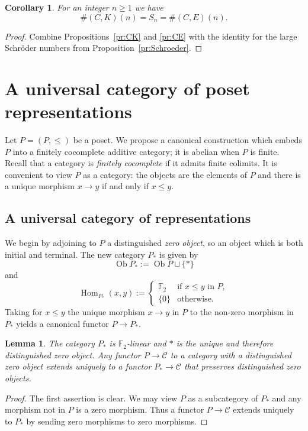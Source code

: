 \documentclass[a4paper]{amsart}
\theoremstyle{plain}
\newtheorem{lem}[thm]{Lemma}
\newtheorem{cor}[thm]{Corollary}
\theoremstyle{definition}
\theoremstyle{remark}
\numberwithin{equation}{section}
\newcommand{\Hom}{\operatorname{Hom}}
\newcommand{\Ob}{\operatorname{Ob}}
\def\C{\mathcal C}
\def\bbF{\mathbb F}
\begin{document}
\begin{cor}\label{pr:CK/CE}
 For an integer $n\ge 1$ we have
 \[\#(C,K)(n)= S_n=\#(C,E)(n).\]
\end{cor}
\begin{proof}
Combine Propositions~\ref{pr:CK} and \ref{pr:CE} with the identity for
the large Schröder numbers from  Proposition~\ref{pr:Schroeder}.
\end{proof}

  
\section{A universal category of poset representations}

Let $P=(P,\le)$ be a poset. We propose a canonical construction which
embeds $P$ into a finitely cocomplete additive category; it is abelian
when $P$ is finite. Recall that a category is \emph{finitely
  cocomplete} if it admits finite colimits. It is convenient to view
$P$ as a category: the objects are the elements of $P$ and there is a
unique morphism $x\to y$ if and only if $x\le y$.

\subsection*{A universal category of representations}
We begin by adjoining to $P$ a distinguished \emph{zero object}, so an
object which is both initial and terminal. The new category $P_*$ is
given by
\[\Ob P_*:=\Ob P\sqcup\{*\}\]
and
\begin{equation*}\label{eq:P*}
  \Hom_{P_*}(x,y):=\begin{cases} \bbF_2&\text{if }x\le y \text{ in } P,\\
    \{0\}& \text{otherwise}.
  \end{cases}
\end{equation*}
Taking for $x\le y$ the unique morphism $x\to y$ in $P$ to the
non-zero morphism in $P_*$ yields a canonical functor $P\to P_*$.

\begin{lem}
  The category $P_*$ is $\bbF_2$-linear and $*$ is the unique and
  therefore distinguished zero
  object. Any functor $P\to\C$ to a category with a distinguished zero
  object 
  extends uniquely to a functor $P_*\to\C$ that preserves distinguished zero
  objects.
\end{lem}
\begin{proof}
  The first assertion is clear.  We may view $P$ as a subcategory of
  $P_*$ and any morphism not in $P$ is a zero morphism.  Thus a
  functor $P\to\C$ extends uniquely to $P_*$ by sending zero morphisms
  to zero morphisms.
\end{proof}
\end{document}

